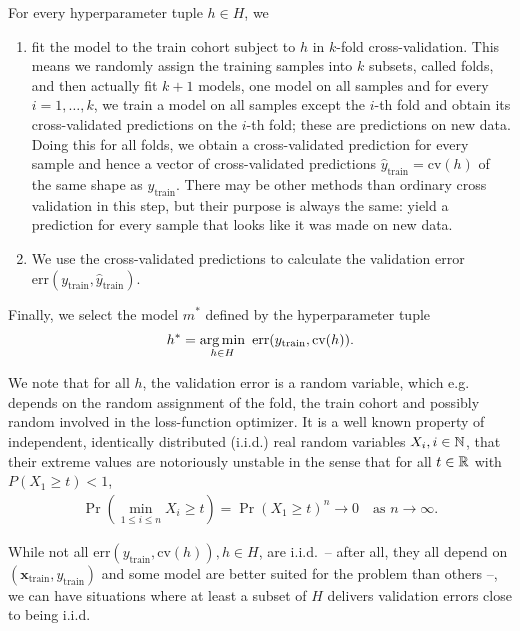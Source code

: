 For every hyperparameter tuple $h \in H$, we
\begin{enumerate}
    \item fit the model to the train cohort subject to $h$ in $k$-fold cross-validation. This means 
        we randomly assign the training samples into $k$ subsets, called folds, and then actually 
        fit $k+1$ models, one model on all samples and for every $i = 1, \ldots, k$, we train a model
        on all samples except the $i$-th fold and obtain its cross-validated predictions on the 
        $i$-th fold; these are predictions on new data. Doing this for all folds, we obtain a 
        cross-validated prediction for every sample and hence a vector of cross-validated predictions
        $\hat{y}_\text{train} = \text{cv}(h)$ of the same shape as $y_\text{train}$. There may be 
        other methods than ordinary cross
        validation in this step, but their purpose is always the same: yield a prediction for every 
        sample that looks like it was made on new data.
    \item We use the cross-validated predictions to calculate the validation error 
        $\text{err}(y_\text{train}, \hat{y}_\text{train})$.
\end{enumerate}

Finally, we select the model $m^*$ defined by the hyperparameter tuple 
\begin{align}
    h^* = \operatorname*{arg\,min}_{h \in H} \ \text{err}(y_\text{train}, \text{cv}(h)).
\end{align}

We note that for all $h$, the validation error is a random variable, which e.g. depends on the 
random assignment of the fold, the train cohort and possibly random involved in the loss-function
optimizer. It is a well known property of independent,
identically distributed (i.i.d.) real random variables $X_i, i \in \mathbb{N}$, that their extreme values 
are notoriously unstable in the sense that for all $t \in \mathbb{R}$ with $P(X_1 \geq t) < 1$, 
\begin{align}
    \Pr\left( \min_{1 \leq i \leq n} X_i \geq t \right) = \Pr(X_1 \geq t)^n \to 0 \quad
    \text{as } n \to \infty.
\end{align}

While not all $\text{err}(y_\text{train}, \text{cv}(h)), h \in H$, are i.i.d.\ -- after all, they 
all depend on 
$(\mathbf{x}_\text{train}, y_\text{train})$ and some model are better suited for the problem than others --,
we can have situations where at least a subset of $H$ delivers validation errors close to being i.i.d.\

